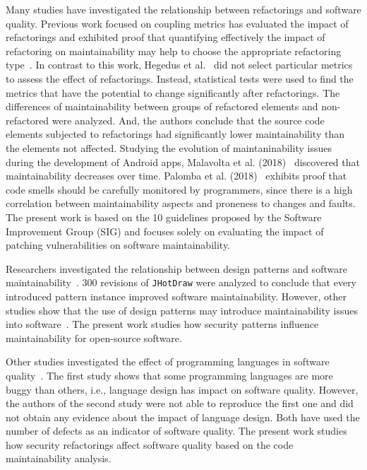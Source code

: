 \documentclass[10pt,conference]{IEEEtran}
\newcommand{\Luis}[1]{\textbf{[Luis:[}{\color{green} #1}\textbf{]]}}
\begin{document}
{Many studies have investigated the relationship between refactorings and software quality.
Previous work focused on coupling metrics has evaluated the impact of refactorings and
exhibited proof that quantifying effectively the impact of refactoring on maintainability
may help to choose the appropriate refactoring type~\cite{1167822}. In contrast to
this work, Hegedus et al.~\cite{HEGEDUS2018313} did not select particular metrics to
assess the effect of refactorings. Instead, statistical tests were used to find
the metrics that have the potential to change significantly after refactorings.
The differences of maintainability between groups of refactored elements and
non-refactored were analyzed. And, the authors conclude that the source
code elements subjected to refactorings had significantly lower maintainability
than the elements not affected. Studying the evolution of maintaninability issues during the development of Android apps, Malavolta et al. (2018)~\cite{8530041} discovered that maintainability
decreases over time. Palomba et al. (2018)~\cite{Palomba:2018:DIM:3231288.3231337} exhibits
proof that code smells should be carefully monitored by programmers, since there is
a high correlation between maintainability aspects and proneness to changes and faults.
The present work is based on the 10 guidelines proposed
by the Software Improvement Group (SIG) and focuses solely on evaluating
the impact of patching vulnerabilities on software maintainability.


Researchers investigated the relationship between design patterns and
software maintainability~\cite{10.1007/978-3-642-35267-6-18}. 300 revisions
of \texttt{JHotDraw} were analyzed to conclude that every introduced pattern
instance improved software maintainability. However, other studies show that the
use of design patterns may introduce maintainability issues into software~\cite{4493325}.
The present work studies how security patterns influence maintainability
for open-source software.

Other studies investigated the effect of programming languages in software quality~\cite{Ray:2017:LSP:3144574.3126905,
2019arXiv190110220B}. The first study shows that some programming languages are more buggy than others, i.e.,
language design has impact on software quality. However, the authors of the second
study were not able to reproduce the first one and did not obtain any evidence about the
impact of language design. Both have used the number of defects as an indicator of
software quality. The present work studies how security refactorings affect software quality
based on the code maintainability analysis.

}
\end{document}
